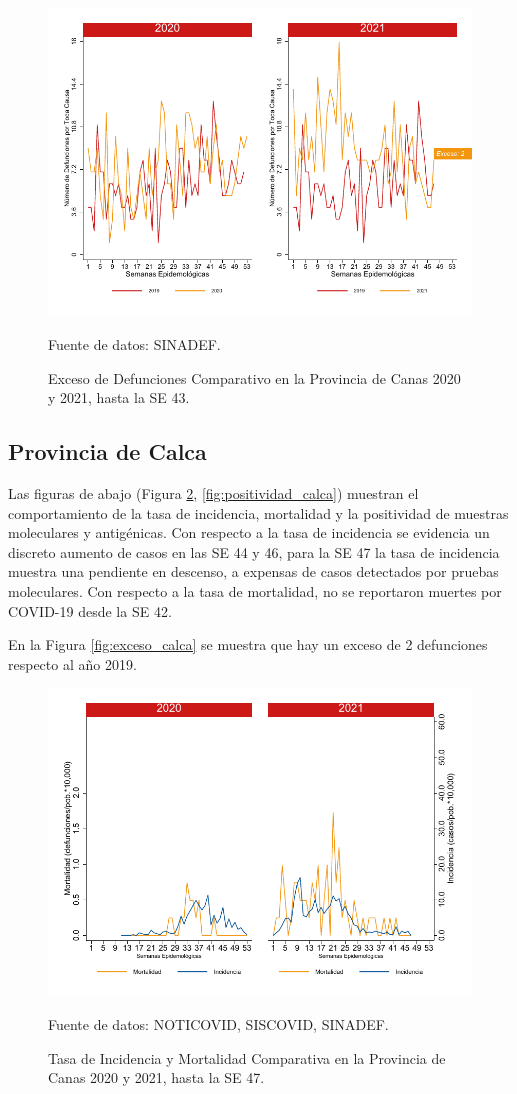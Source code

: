 \documentclass[12pt,a4paper,openany]{book}
\begin{document}
		\begin{figure}[h]
			\caption{Exceso de Defunciones Comparativo en la Provincia de Canas 2020 y 2021, hasta la SE 43.}\label{fig:exceso_canas}
			\begin{center}
				\includegraphics[width=0.7\linewidth]{../figuras/exceso_3}
			\end{center}
			{\footnotesize {Fuente de datos: SINADEF.}}
		\end{figure}
		
		\clearpage
		
		\subsection*{Provincia de Calca}
		\noindent Las figuras de abajo (Figura \ref{fig:inc_mort_calca}, \ref{fig:positividad_calca}) muestran el comportamiento de la tasa de incidencia, mortalidad y la positividad de muestras moleculares y antigénicas. Con respecto a la tasa de incidencia se evidencia un discreto aumento de casos en las SE 44 y 46, para la SE 47 la tasa de incidencia muestra una pendiente en descenso, a expensas de casos detectados por pruebas moleculares. Con respecto a la tasa de mortalidad, no se reportaron muertes por COVID-19 desde la SE 42.
		
		En la Figura \ref{fig:exceso_calca} se muestra que hay un exceso de 2 defunciones respecto al año 2019.
		
		\begin{figure}[h]
			\caption{Tasa de Incidencia y Mortalidad Comparativa en la Provincia de Canas 2020 y 2021, hasta la SE 47.}\label{fig:inc_mort_calca}
			\begin{center}
				\includegraphics[width=0.7\linewidth]{../figuras/incidencia_mortalidad_20_21_4}
			\end{center}
			{\footnotesize {Fuente de datos: NOTICOVID, SISCOVID, SINADEF.}}
		\end{figure}
		
\end{document}
